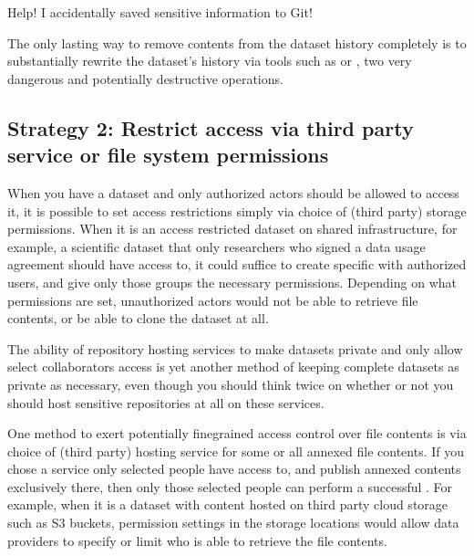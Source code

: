 \ignorespaces \begin{findoutmore}[label={fom-uncommit}, before title={\thetcbcounter\ }, float, floatplacement=tb, check odd page=true]{Help! I accidentally saved sensitive information to Git!}
\label{\detokenize{basics/101-139-privacy:fom-uncommit}}

\sphinxAtStartPar
The only lasting way to remove contents from the dataset history completely is to substantially rewrite the dataset’s history via tools such as  or , two very dangerous and potentially destructive operations.


\end{findoutmore}


\subsection{Strategy 2: Restrict access via third party service or file system permissions}
\label{\detokenize{basics/101-139-privacy:strategy-2-restrict-access-via-third-party-service-or-file-system-permissions}}
\sphinxAtStartPar
When you have a dataset and only authorized actors should be allowed to access it,
it is possible to set access restrictions simply via choice of (third party) storage permissions.
When it is an access restricted dataset on shared infrastructure, for example, a scientific dataset that only researchers who signed a data usage agreement should have access to, it could suffice to create specific  with authorized users, and give only those groups the necessary permissions.
Depending on what permissions are set, unauthorized actors would not be able to retrieve file contents, or be able to clone the dataset at all.

\sphinxAtStartPar
The ability of repository hosting services to make datasets private and only allow select collaborators access is yet another method of keeping complete datasets as private as necessary, even though you should think twice on whether or not you should host sensitive repositories at all on these services.

\sphinxAtStartPar
One method to exert potentially fine\sphinxhyphen{}grained access control over file contents is via choice of (third party) hosting service for some or all annexed file contents.
If you chose a service only selected people have access to, and publish annexed contents exclusively there, then only those selected people can perform a successful .
For example, when it is a dataset with content hosted on third party cloud storage such as S3 buckets, permission settings in the storage locations would allow data providers to specify or limit who is able to retrieve the file contents.


